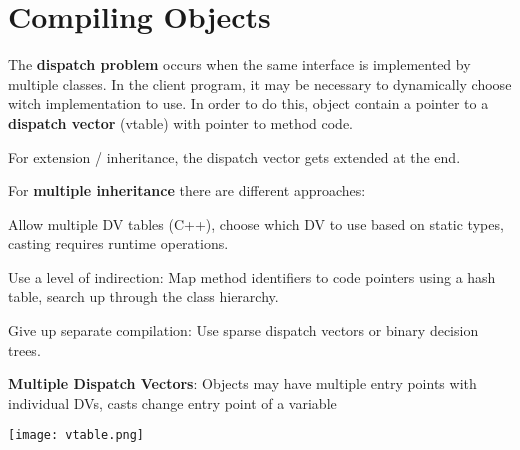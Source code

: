 \section*{Compiling Objects}

The \textbf{dispatch problem} occurs when the same interface is implemented by multiple classes. In the client program, it may be necessary to dynamically choose witch implementation to use. In order to do this, object contain a pointer to a \textbf{dispatch vector} (vtable) with pointer to method code. \medskip

For extension / inheritance, the dispatch vector gets extended at the end.\medskip

For \textbf{multiple inheritance} there are different approaches:
\begin{compactitem}[$\quad\bullet$]
	\item Allow multiple DV tables (C++), choose which DV to use based on static types, casting requires runtime operations.

	\item Use a level of indirection: Map method identifiers to code pointers using a hash table, search up through the class hierarchy.

	\item Give up separate compilation: Use sparse dispatch vectors or binary decision trees.
\end{compactitem}

\textbf{Multiple Dispatch Vectors}: Objects may have multiple entry points with individual DVs, casts change entry point of a variable
\vspace{-8pt}
\begin{center}
	\texttt{[image: vtable.png]}
\end{center}
\vspace{-20pt}
